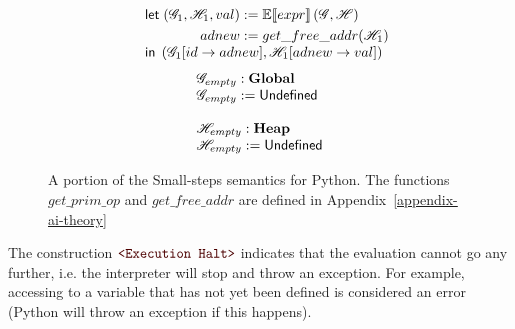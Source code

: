 \begin{figure}
\begin{minipage}{.46\textwidth}
\[\begin{array}{l}
    \quad \mathsf{let}\;
    \begin{aligned}[t]
      \left(\mathscr{G}_1, \mathscr{H}_1, val\right) &:= \mathbb{E}\!\left\llbracket expr \right\rrbracket\left(\mathscr{G}, \mathscr{H}\right) \\
      adnew &:= get\_free\_addr(\mathscr{H}_1) \\
    \end{aligned}\\
    \quad \mathsf{in}\; \left(\mathscr{G}_1[id \to adnew], \mathscr{H}_1[adnew \to val]\right) \\
  \end{array}
\]
\[
  \begin{array}{l}
    \mathscr{G}_{empty} : \mathbf{Global} \\
    \mathscr{G}_{empty} := \mathsf{Undefined} \\
    \\
    \mathscr{H}_{empty} : \mathbf{Heap} \\
    \mathscr{H}_{empty} := \mathsf{Undefined} \\
  \end{array}
\]
\end{minipage}
\caption{A portion of the Small-steps semantics for Python. The functions $get\_prim\_op$
  and $get\_free\_addr$ are defined in Appendix~\ref{appendix-ai-theory}\label{smallstep1}}
\end{figure}

%
%

The construction $\Halt$ indicates that the evaluation cannot go any further, i.e. the
interpreter will stop and throw an exception. For example, accessing to a variable that
has not yet been defined is considered an error (Python will throw an exception if this
happens).

